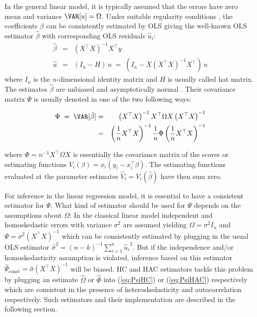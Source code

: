\documentclass{Z}
\begin{document}
In the general linear model, it is typically assumed that the
errors have zero mean and variance $\VAR[u] = \Omega$. Under
suitable regularity conditions \citep[see e.g.,][]{hac:Greene:1993,hac:White:2000},
the coefficients $\beta$ can be consistently estimated by 
OLS giving the well-known OLS estimator $\hat \beta$ with corresponding OLS residuals $\hat u_i$:
\begin{eqnarray}
  \hat \beta & = & \left( X^\top X \right)^{-1} X^\top y \\
  \hat u & = & (I_n - H) \, u \; = \; (I_n - X \left( X^\top X \right)^{-1} X^\top) \, u
\end{eqnarray}
where $I_n$ is the $n$-dimensional identity matrix and $H$ is usually 
called hat matrix. The estimates $\hat \beta$ are unbiased and
asymptotically normal \citep{hac:White:2000}. Their covariance matrix $\Psi$ is usually
denoted in one of the two following ways:

\begin{eqnarray}
  \Psi \; = \; \VAR[\hat \beta] & = & 
    \left( X^\top X \right)^{-1} X^\top \Omega X \left( X^\top X \right)^{-1} \label{eq:PsiHC} \\
    & = & \left( \frac{1}{n} X^\top X \right)^{-1} \frac{1}{n} \Phi
          \left( \frac{1}{n} X^\top X \right)^{-1} \label{eq:PsiHAC}
\end{eqnarray}

where $\Phi = n^{-1} X^\top \Omega X$ is essentially the covariance
matrix of the scores or estimating functions $V_i(\beta) = x_i (y_i - x_i^\top \beta)$.
The estimating functions evaluated at the parameter estimates
$\hat V_i = V_i(\hat \beta)$ have then sum zero.

For inference in the linear regression model, it is essential
to have a consistent estimator for $\Psi$. What kind of 
estimator should be used for $\Psi$ depends on the assumptions about $\Omega$:
In the classical linear model independent and homoskedastic
errors with variance $\sigma^2$ are assumed yielding $\Omega = \sigma^2 I_n$
and $\Psi = \sigma^2 (X^\top X)^{-1}$ which can be consistently estimated by
plugging in the usual OLS estimator
${\hat \sigma}^2 = (n-k)^{-1} \sum_{i = 1}^n {\hat u_i}^2$.
But if the independence and/or homoskedasticity assumption is violated,
inference based on this estimator $\hat \Psi_{\mathrm{const}} = \hat \sigma (X^\top X)^{-1}$
will be biased. HC and HAC estimators tackle
this problem by plugging an estimate $\hat \Omega$ or $\hat \Phi$ into
(\ref{eq:PsiHC}) or (\ref{eq:PsiHAC}) respectively which are consistent
in the presence of heteroskedasticity and autocorrelation respectively.
Such estimators and their implementation are described in the following
section.
\end{document}
